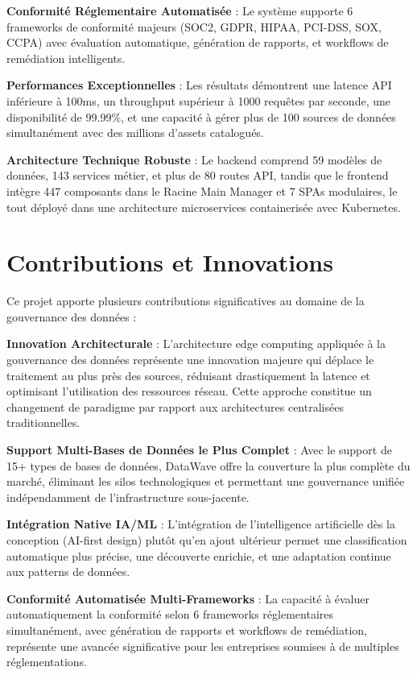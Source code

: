 \textbf{Conformité Réglementaire Automatisée} : Le système supporte 6 frameworks de conformité majeurs (SOC2, GDPR, HIPAA, PCI-DSS, SOX, CCPA) avec évaluation automatique, génération de rapports, et workflows de remédiation intelligents.

\textbf{Performances Exceptionnelles} : Les résultats démontrent une latence API inférieure à 100ms, un throughput supérieur à 1000 requêtes par seconde, une disponibilité de 99.99\%, et une capacité à gérer plus de 100 sources de données simultanément avec des millions d'assets catalogués.

\textbf{Architecture Technique Robuste} : Le backend comprend 59 modèles de données, 143 services métier, et plus de 80 routes API, tandis que le frontend intègre 447 composants dans le Racine Main Manager et 7 SPAs modulaires, le tout déployé dans une architecture microservices containerisée avec Kubernetes.

\section*{Contributions et Innovations}

Ce projet apporte plusieurs contributions significatives au domaine de la gouvernance des données :

\textbf{Innovation Architecturale} : L'architecture edge computing appliquée à la gouvernance des données représente une innovation majeure qui déplace le traitement au plus près des sources, réduisant drastiquement la latence et optimisant l'utilisation des ressources réseau. Cette approche constitue un changement de paradigme par rapport aux architectures centralisées traditionnelles.

\textbf{Support Multi-Bases de Données le Plus Complet} : Avec le support de 15+ types de bases de données, DataWave offre la couverture la plus complète du marché, éliminant les silos technologiques et permettant une gouvernance unifiée indépendamment de l'infrastructure sous-jacente.

\textbf{Intégration Native IA/ML} : L'intégration de l'intelligence artificielle dès la conception (AI-first design) plutôt qu'en ajout ultérieur permet une classification automatique plus précise, une découverte enrichie, et une adaptation continue aux patterns de données.

\textbf{Conformité Automatisée Multi-Frameworks} : La capacité à évaluer automatiquement la conformité selon 6 frameworks réglementaires simultanément, avec génération de rapports et workflows de remédiation, représente une avancée significative pour les entreprises soumises à de multiples réglementations.

